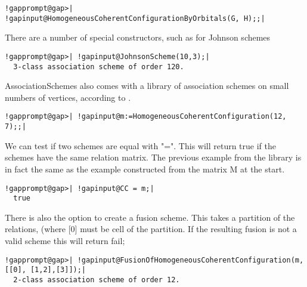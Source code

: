 \documentclass[a4paper,11pt]{report}
\begin{document}
{{\begin{Verbatim}[commandchars=!@|,fontsize=\small,frame=single,label=Example]
  !gapprompt@gap>| !gapinput@HomogeneousCoherentConfigurationByOrbitals(G, H);;|
\end{Verbatim}
 There are a number of special constructors, such as for Johnson schemes 
\begin{Verbatim}[commandchars=!@|,fontsize=\small,frame=single,label=Example]
  !gapprompt@gap>| !gapinput@JohnsonScheme(10,3);|
  3-class association scheme of order 120.
\end{Verbatim}
 AssociationSchemes also comes with a library of association schemes on small
numbers of vertices, according to \cite{Hanaki}. 
\begin{Verbatim}[commandchars=!@|,fontsize=\small,frame=single,label=Example]
  !gapprompt@gap>| !gapinput@m:=HomogeneousCoherentConfiguration(12, 7);;|
\end{Verbatim}
 We can test if two schemes are equal with "=". This will return true if the
schemes have the same relation matrix. The previous example from the library
is in fact the same as the example constructed from the matrix M at the start. 
\begin{Verbatim}[commandchars=!@|,fontsize=\small,frame=single,label=Example]
  !gapprompt@gap>| !gapinput@CC = m;|
  true
\end{Verbatim}
 There is also the option to create a fusion scheme. This takes a partition of
the relations, (where [0] must be cell of the partition. If the resulting
fusion is not a valid scheme this will return fail; 
\begin{Verbatim}[commandchars=!@|,fontsize=\small,frame=single,label=Example]
  !gapprompt@gap>| !gapinput@FusionOfHomogeneousCoherentConfiguration(m, [[0], [1,2],[3]]);|
  2-class association scheme of order 12.
\end{Verbatim}
 }

 }

   
\end{document}
